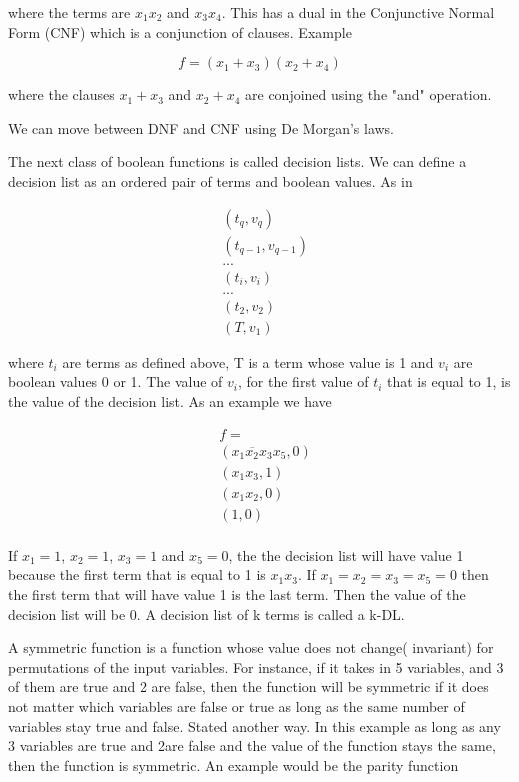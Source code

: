 \documentclass[10pt,a4paper]{article}
\begin{document}
where the terms are $x_1x_2$ and $x_3x_4$. This has a dual in the Conjunctive Normal Form (CNF) which is a conjunction of clauses. Example

\begin{equation}
f= (x_1 + x_3)(x_2 + x_4)
\end{equation}

where the clauses $x_1+x_3$ and $x_2+x_4$ are conjoined using the "and" operation.

We can move between DNF and CNF using De Morgan's laws.

The next class of boolean functions is called decision lists. We can define a decision list as an ordered pair of terms and boolean values. As in

\begin{equation}
\begin{split}
&(t_q,v_q) \\
&(t_{q-1},v_{q-1}) \\
&...\\
&(t_i,v_i) \\
&...\\
&(t_2,v_2)\\
&(T,v_1)\
\end{split}
\end{equation} 

where $t_i$ are terms as defined above, T is a term whose value is 1 and $v_i$ are boolean values 0 or 1. The value of $v_i$, for the first value of $t_i$ that is equal to 1, is the value of the decision list. As an example we have

\begin{equation}
\begin{split}
& f = \\
&(x_1 \overline{x_2} x_3x_5,0) \\
&(x_1x_3,1)\\
&(x_1x_2,0)\\
&(1,0)\\
\end{split}
\end{equation} 

If $x_1 = 1$, $x_2=1$, $x_3=1$ and $x_5=0$, the the decision list will have value 1 because the first term that is equal to 1 is $x_1x_3$. If $x_1=x_2=x_3=x_5=0$ then the first term that will have value 1 is the last term. Then the value of the decision list will be 0. A decision list of k terms is called a k-DL.

A symmetric function is a function whose value does not change( invariant) for  permutations of the input variables. For instance, if it takes in 5 variables, and 3 of them are true and 2 are false, then the function will be symmetric if it does not matter which variables are false or true as long as the same number of variables stay true and false. Stated another way. In this example as long as any 3 variables are true and 2are false and the value of the function stays the same, then the function is symmetric. An example would be the parity function
\end{document}
